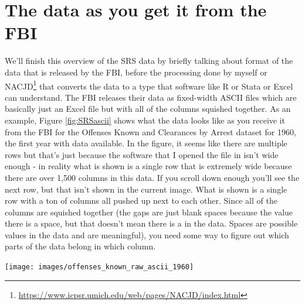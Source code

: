 \documentclass[
]{krantz}
\let\origfigure\figure
\let\endorigfigure\endfigure
\renewenvironment{figure}[1][2] {
    \expandafter\origfigure\expandafter[H]
} {
    \endorigfigure
}
\renewcommand{\href}[2]{#2\footnote{\url{#1}}}
\begin{document}
\section{The data as you get it from the
FBI}\label{the-data-as-you-get-it-from-the-fbi}

We'll finish this overview of the SRS data by briefly
talking about format of the data that is released by the
FBI, before the processing done by myself or
\href{https://www.icpsr.umich.edu/web/pages/NACJD/index.html}{NACJD}
that converts the data to a type that software like R or
Stata or Excel can understand. The FBI releases their data
as fixed-width ASCII files which are basically just an Excel
file but with all of the columns squished together. As an
example, Figure \ref{fig:SRSascii} shows what the data looks
like as you receive it from the FBI for the Offenses Known
and Clearances by Arrest dataset for 1960, the first year
with data available. In the figure, it seems like there are
multiple rows but that's just because the software that I
opened the file in isn't wide enough - in reality what is
shown is a single row that is extremely wide because there
are over 1,500 columns in this data. If you scroll down
enough you'll see the next row, but that isn't shown in the
current image. What is shown is a single row with a ton of
columns all pushed up next to each other. Since all of the
columns are squished together (the gaps are just blank
spaces because the value there is a space, but that doesn't
mean there is a in the data. Spaces are possible values in
the data and are meaningful), you need some way to figure
out which parts of the data belong in which column.

\begin{figure}

{\centering \texttt{[image: images/offenses\_known\_raw\_ascii\_1960]} 

}

\caption{Fixed-width ASCII file for the 1960 Offenses Known and Clearances by Arrest dataset.}\label{fig:SRSascii}
\end{figure}
\end{document}

